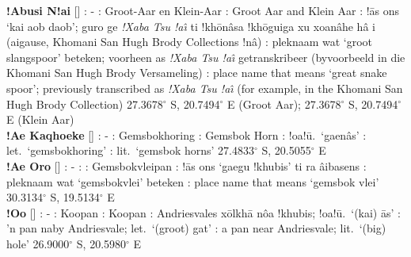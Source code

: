 \textbf{!Abusi N!ai} []
: - : Groot-Aar en Klein-Aar
: Groot Aar and Klein Aar : !\={a}s
\textvertline{}ons `kai \textvertline{}aob daob';
\textdoublebarpipe{}guro ge \emph{!Xaba Tsu !a\^{\i}} ti
!kh\={o}\textdoublevertline{}n\^{a}sa
!kh\={o}\textdoublevertline{}guiga xu xoa\textdoublevertline{}n\^{a}he
h\^{a} i (ai\textdoublevertline{}gause, \textdoublebarpipe{}Khomani
San Hugh Brody Collections !n\^{a}) : pleknaam wat
`groot slangspoor' beteken; voorheen as \emph{!Xaba Tsu !a\^{\i}}
getranskribeer (byvoorbeeld in die \textdoublebarpipe{}Khomani San
Hugh Brody Versameling) : place name that means `great
snake spoor'; previously transcribed as \emph{!Xaba Tsu !a\^{\i}} (for
example, in the \textdoublebarpipe{}Khomani San Hugh Brody Collection)
27.3678$^{\circ}$ S, 20.7494$^{\circ}$ E (Groot Aar);
27.3678$^{\circ}$ S, 20.7494$^{\circ}$ E (Klein Aar) \\

\textbf{!Ae Ka\textdoublevertline{}qhoeke} [] : -
: Gemsbokhoring : Gemsbok Horn
: !oa!\={u}.\
`\textvertline{}gae\textdoublevertline{}n\^{a}s' : let.\
`gemsbokhoring' : lit.\ `gemsbok horns'
27.4833$^{\circ}$ S, 20.5055$^{\circ}$ E \\

\textbf{!Ae \textdoublebarpipe{}Oro} [] : - :
\underbar{Eng}: Gemsbokvleipan \underbar{Nama}: !\={a}s
\textvertline{}ons `\textvertline{}gaegu !khubis' ti ra
\textdoublebarpipe{}\^{a}ibasens \underbar{Afr}: pleknaam wat
`gemsbokvlei' beteken \underbar{Eng}: place name that means `gemsbok
vlei' 30.3134$^{\circ}$ S, 19.5134$^{\circ}$ E \\

\textbf{!Oo} [] : - :
Koopan : Koopan : Andriesvales
x\={o}lkh\={a} \textdoublebarpipe{}n\^{o}a !khubis; !oa!\={u}.\ `(kai)
\={a}s' \underbar{Afr}: 'n pan naby Andriesvale; let.\ `(groot) gat'
\underbar{Eng}: a pan near Andriesvale; lit.\ `(big) hole'
26.9000$^{\circ}$ S, 20.5980$^{\circ}$ E \\

